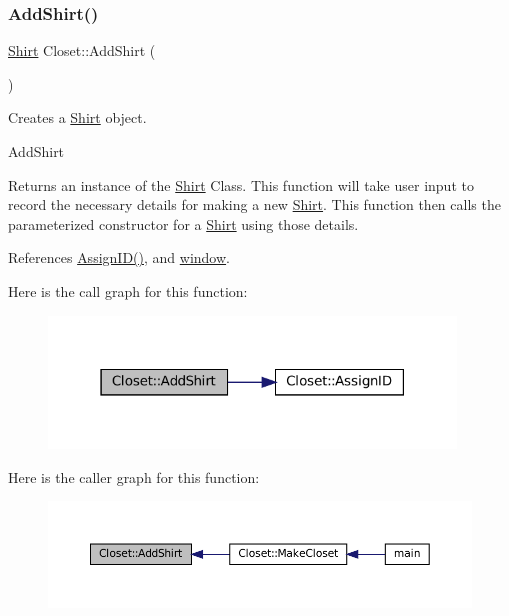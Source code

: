 \subsubsection{\texorpdfstring{Add\+Shirt()}{AddShirt()}}
{\footnotesize\ttfamily \mbox{\hyperlink{classShirt}{Shirt}} Closet\+::\+Add\+Shirt (\begin{DoxyParamCaption}{ }\end{DoxyParamCaption})\hspace{0.3cm}{\ttfamily [private]}}



Creates a \textquotesingle{}\mbox{\hyperlink{classShirt}{Shirt}}\textquotesingle{} object. 

Add\+Shirt \begin{DoxyReturn}{Returns}
an instance of the \textquotesingle{}\mbox{\hyperlink{classShirt}{Shirt}}\textquotesingle{} Class.  This function will take user input to record the necessary details for making a new \textquotesingle{}\mbox{\hyperlink{classShirt}{Shirt}}\textquotesingle{}. This function then calls the parameterized constructor for a \textquotesingle{}\mbox{\hyperlink{classShirt}{Shirt}}\textquotesingle{} using those details. 
\end{DoxyReturn}


References \mbox{\hyperlink{classCloset_afabc27d621abdf0089a6b3027ea8f470}{Assign\+I\+D()}}, and \mbox{\hyperlink{classCloset_af1eb4f786cc4eccd3018b90632236a93}{window}}.

Here is the call graph for this function\+:
\nopagebreak
\begin{figure}[H]
\begin{center}
\leavevmode
\includegraphics[width=307pt]{classCloset_aba3296cf8964b43f64911cc69c56cbfd_cgraph}
\end{center}
\end{figure}
Here is the caller graph for this function\+:
\nopagebreak
\begin{figure}[H]
\begin{center}
\leavevmode
\includegraphics[width=350pt]{classCloset_aba3296cf8964b43f64911cc69c56cbfd_icgraph}
\end{center}
\end{figure}
\mbox{\label{classCloset_a489badac5a919460e8cc8e216f8b3eac}} 

